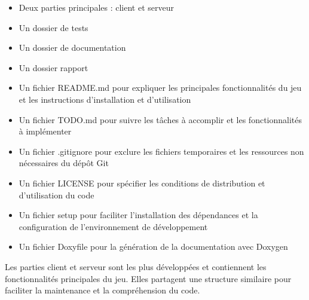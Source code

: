 \documentclass[12pt,a4paper]{article}
\begin{document}
        \begin{itemize}
            \item Deux parties principales : client et serveur
            \item Un dossier de tests
            \item Un dossier de documentation
            \item Un dossier rapport 
            \item Un fichier README.md pour expliquer les principales fonctionnalités du jeu et les instructions d'installation et d'utilisation
            \item Un fichier TODO.md pour suivre les tâches à accomplir et les fonctionnalités à implémenter
            \item Un fichier .gitignore pour exclure les fichiers temporaires et les ressources non nécessaires du dépôt Git
            \item Un fichier LICENSE pour spécifier les conditions de distribution et d'utilisation du code
            \item Un fichier setup pour faciliter l'installation des dépendances et la configuration de l'environnement de développement
            \item Un fichier Doxyfile pour la génération de la documentation avec Doxygen
        \end{itemize}

        \vspace{0.5cm}

        Les parties client et serveur sont les plus développées et contiennent les fonctionnalités principales du jeu. 
        Elles partagent une structure similaire pour faciliter la maintenance et la compréhension du code.

        \vspace{0.5cm}
\end{document}
